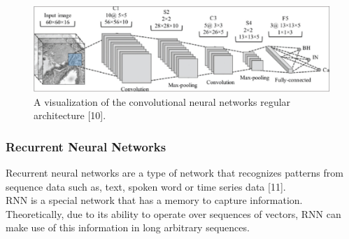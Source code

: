 \begin{figure}[ht]
\centering
\includegraphics{Figures/cnn}
\decoRule
\caption[A visualization of the convolutional neural networks regular architecture “10”]{A visualization of the convolutional neural networks regular architecture [10].}
\label{fig:la}
\end{figure}
\newpage
\subsubsection{Recurrent Neural Networks}
\hspace{5mm} Recurrent neural networks are a type of network that recognizes patterns from sequence data such as, text, spoken word or time series data [11].\\

RNN is a special network that has a memory to capture information. Theoretically, due to its ability to operate over sequences of vectors, RNN can make use of this information in long arbitrary sequences.\\

